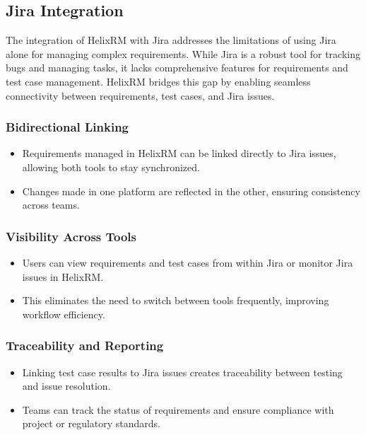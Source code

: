 \subsection{Jira Integration}\label{subsec:jira-integration}

The integration of HelixRM with Jira addresses the limitations of using Jira alone for managing complex requirements.
While Jira is a robust tool for tracking bugs and managing tasks, it lacks comprehensive features for requirements and test case management.
HelixRM bridges this gap by enabling seamless connectivity between requirements, test cases, and Jira issues.

    \subsubsection*{Bidirectional Linking}
    \begin{itemize}
        \item Requirements managed in HelixRM can be linked directly to Jira issues, allowing both tools to stay synchronized.
        \item Changes made in one platform are reflected in the other, ensuring consistency across teams.
    \end{itemize}

    \subsubsection*{Visibility Across Tools}
    \begin{itemize}
        \item Users can view requirements and test cases from within Jira or monitor Jira issues in HelixRM\@.
        \item This eliminates the need to switch between tools frequently, improving workflow efficiency.
    \end{itemize}

    \subsubsection*{Traceability and Reporting}
    \begin{itemize}
        \item Linking test case results to Jira issues creates traceability between testing and issue resolution.
        \item Teams can track the status of requirements and ensure compliance with project or regulatory standards.
    \end{itemize}

